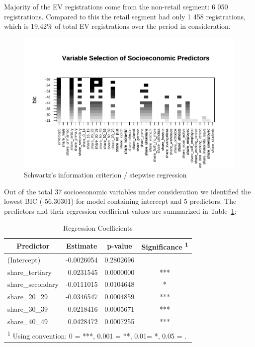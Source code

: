 \documentclass{mmeproc}
\begin{document}
Majority of the EV registrations come from the non-retail segment: 6 050
registrations. Compared to this the retail segment had only 1 458
registrations, which is 19.42\% of total EV registrations over the
period in consideration.

\begin{figure}[H]

{\centering \includegraphics{jla-submission_files/figure-pdf/fig-stepwise-1.pdf}

}

\caption{\label{fig-stepwise}Schwartz's information criterion / stepwise
regression}

\end{figure}

Out of the total 37 socioeconomic variables under consideration we
identified the lowest BIC (-56.30301) for model containing intercept and
5 predictors. The predictors and their regression coefficient values are
summarized in Table~\ref{tbl-coeffs}:

\hypertarget{tbl-coeffs}{}
\begin{table}[H]
\centering
\begin{tabular}{lrrc}
\toprule
\multicolumn{1}{c}{\textbf{Predictor}} & \multicolumn{1}{c}{\textbf{Estimate}} & \multicolumn{1}{c}{\textbf{p-value}} & \multicolumn{1}{c}{\textbf{Significance \textsuperscript{1}}}\\
\midrule
(Intercept) & -0.0026054 & 0.2802696 & \\
share\_tertiary & 0.0231545 & 0.0000000 & ***\\
share\_secondary & -0.0111015 & 0.0104648 & *\\
share\_20\_29 & -0.0346547 & 0.0004859 & ***\\
share\_30\_39 & 0.0218416 & 0.0005671 & ***\\
share\_40\_49 & 0.0428472 & 0.0007255 & ***\\
\bottomrule
\multicolumn{4}{l}{\rule{0pt}{1em}\textsuperscript{1} Using convention: 0 = ***, 0.001 = **, 0.01=  *, 0.05 = .}\\
\end{tabular}
\caption{\label{tbl-coeffs}Regression Coefficients}
\end{table}
\end{document}
